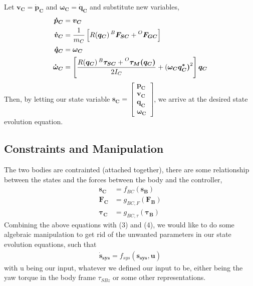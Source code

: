 Let $\bm{v_C} = \bm{\dot{p}_C}$ and $\bm{\omega_C} = \bm{\dot{q}_C}$ and substitute new variables,
\begin{align*}
  \bm{\dot{p}_C} &= \bm{v_C} \\
  \bm{\dot{v}_C} &= \frac{1}{m_C} \left[R(\bm{q_C})\prescript{B}{}{\bm{F_{SC}}} + \prescript{O}{}{\bm{F_{GC}}}\right] \\
  \bm{\dot{q}_C} &= \bm{\omega_C} \\
  \bm{\dot{\omega}_C} &= \left[ \frac{R(\bm{q_C}) \prescript{B}{}{\bm{\tau_{SC}}} + \prescript{O}{}{\bm{\tau_M(\bm{q_C})}}}{2I_C} + {(\bm{\omega_C} \bm{{q^*_C})}}^2 \right] \bm{q_C}
\end{align*}
Then, by letting our state variable $\bm{s_C} =
\begin{bmatrix}
  \bm{p_C} \\
  \bm{v_C} \\
  \bm{q_C} \\
  \bm{\omega_C}
\end{bmatrix}
$, we arrive at the desired state evolution equation.
\subsection{Constraints and Manipulation}
The two bodies are contrainted (attached together), there are some relationship between the states and the forces between the body and the controller, 
\begin{align}
  \bm{s_C} &= f_{BC}(\bm{s_B}) \\
  \bm{F_C} &= g_{BC,F}(\bm{F_B}) \\
  \bm{\tau_C} &= g_{BC,\tau}(\bm{\tau_B})
\end{align}
Combining the above equations with (3) and (4), we would like to do some algebraic manipulation to get rid of the unwanted parameters in our state evolution equations, such that
\begin{align*}
  \bm{\dot{s}_{sys}} = f_{sys}(\bm{s_{sys}}, \bm{u})
\end{align*}
with u being our input, whatever we defined our input to be, either being the yaw torque in the body frame $\tau_{SBz}$ or some other representations.
